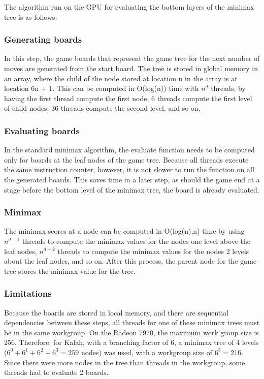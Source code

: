 \documentclass{article}
\begin{document}
The algorithm run on the GPU for evaluating the bottom layers of the minimax tree is as follows:

\subsubsection{Generating boards}
In this step, the game boards that represent the game tree for the next number of moves are generated from the start board. The tree is stored in global memory in an array, where the child of the node stored at location n in the array is at location 6n + 1. This can be computed in O(log(n)) time with $n^{d}$ threads, by having the first thread compute the first node, 6 threads compute the first level of child nodes, 36 threads compute the second level, and so on.

\subsubsection{Evaluating boards}
In the standard minimax algorithm, the evaluate function needs to be computed only for boards at the leaf nodes of the game tree. Because all threads execute the same instruction counter, however, it is not slower to run the function on all the generated boards. This saves time in a later step, as should the game end at a stage before the bottom level of the minimax tree, the board is already evaluated.

\subsubsection{Minimax}
The minimax scores at a node can be computed in O(log(n),n) time by using $n^{d-1}$ threads to compute the minimax values for the nodes one level above the leaf nodes, $n^{d-2}$ threads to compute the minimax values for the nodes 2 levels about the leaf nodes, and so on. After this process, the parent node for the game tree stores the minimax value for the tree.

\subsubsection{Limitations}
Because the boards are stored in local memory, and there are sequential dependencies between these steps, all threads for one of these minimax trees must be in the same workgroup. On the Radeon 7970, the maximum work group size is 256. Therefore, for Kalah, with a branching factor of 6, a minimax tree of 4 levels ($6^0 + 6^1 + 6^2 + 6^3 = 259$ nodes) was used, with a workgroup size of $6^3 = 216$. Since there were more nodes in the tree than threads in the workgroup, some threads had to evaluate 2 boards.
\end{document}

